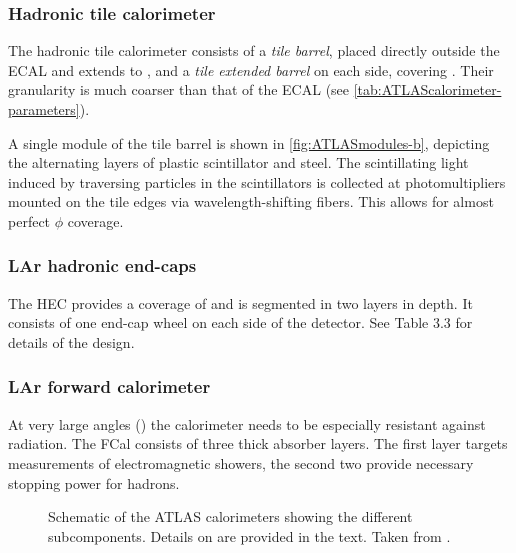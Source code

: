 \subsubsection{Hadronic tile calorimeter}
The hadronic tile calorimeter consists of a \emph{tile barrel}, placed directly outside the ECAL and extends to , and a \emph{tile extended barrel} on each side, covering .
Their granularity is much coarser than that of the ECAL (see \cref{tab:ATLAScalorimeter-parameters}).

A single module of the tile barrel is shown in \cref{fig:ATLASmodules-b}, depicting the alternating layers of plastic scintillator and steel. The scintillating light induced by traversing particles in the scintillators is collected at photomultipliers mounted on the tile edges via wavelength-shifting fibers. This allows for almost perfect $\phi$ coverage.

\subsubsection{LAr hadronic end-caps}
The HEC provides a coverage of  and is segmented in two layers in depth. It consists of one end-cap wheel on each side of the detector. See Table 3.3 for details of the design.

\subsubsection{LAr forward calorimeter}
At very large angles () the calorimeter needs to be especially resistant against radiation. The FCal consists of three thick absorber layers. The first layer targets measurements of electromagnetic showers, the second two provide necessary stopping power for hadrons.




\begin{figure}
    \caption[Schematic of the ATLAS calorimeters showing the different subcomponents.]{Schematic of the ATLAS calorimeters showing the different subcomponents. Details on are provided in the text. Taken from .}
    \label{fig:ATLAScalorimeters}
\end{figure}

